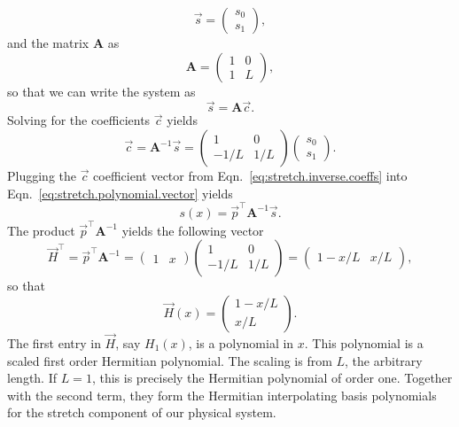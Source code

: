 \begin{equation}
\vec s = 
\begin{pmatrix}
s_0 \\
s_1
\end{pmatrix},
\end{equation}
and the matrix $\mathbf{A}$ as
\begin{equation}
\mathbf A = 
\begin{pmatrix}
1 & 0 \\
1 & L
\end{pmatrix},
\end{equation}
so that we can write the system as
\begin{equation}
\vec{s} = \mathbf{A}\vec{c}.
\end{equation}
Solving for the coefficients $\vec{c}$ yields
\begin{equation}
\vec{c} = \mathbf{A}^{-1}\vec{s} = 
\begin{pmatrix}
1 & 0 \\
-1/L & 1/L
\end{pmatrix}
\begin{pmatrix}
s_0 \\
s_1
\end{pmatrix}.
\label{eq:stretch.inverse.coeffs}
\end{equation}
Plugging the $\vec{c}$ coefficient vector from Eqn.~\ref{eq:stretch.inverse.coeffs} into Eqn.~\ref{eq:stretch.polynomial.vector} yields
\begin{equation}
s(x) = \vec{p}^\top\mathbf{A}^{-1}\vec{s}.
\end{equation}
The product $\vec{p}^\top\mathbf{A}^{-1}$ yields the following vector
\begin{equation}
\vec{H}^\top = \vec{p}^\top\mathbf{A}^{-1} = 
\begin{pmatrix}
1 & x
\end{pmatrix}
\begin{pmatrix}
1 & 0 \\
-1/L & 1/L
\end{pmatrix} = 
\begin{pmatrix}
1-x/L & x/L
\end{pmatrix},
\end{equation}
so that
\begin{equation}
\vec H(x) =
\begin{pmatrix}
1-x/L \\
x/L
\end{pmatrix}.
\end{equation}
The first entry in $\vec H$, say $H_1(x)$, is a polynomial in $x$. This polynomial is a scaled first order Hermitian polynomial. The scaling is from $L$, the arbitrary length. If $L=1$, this is precisely the Hermitian polynomial of order one. Together with the second term, they form the Hermitian interpolating basis polynomials for the stretch component of our physical system.

